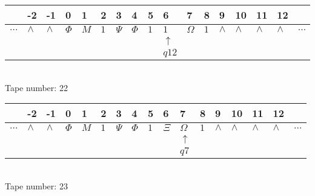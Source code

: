 \documentclass{article}
\begin{document}
\begin{table}[H]
\centering
\begin{tabular}{lllllllllllllllll}
 & -2 & -1 & 0 & 1 & 2 & 3 & 4 & 5 & 6 & 7 & 8 & 9 & 10 & 11 & 12 & \\
\hline
$...$ & \multicolumn{1}{|l|}{$\wedge$} & \multicolumn{1}{|l|}{$\wedge$} & \multicolumn{1}{|l|}{$\Phi$} & \multicolumn{1}{|l|}{$M$} & \multicolumn{1}{|l|}{$1$} & \multicolumn{1}{|l|}{$\Psi$} & \multicolumn{1}{|l|}{$\Phi$} & \multicolumn{1}{|l|}{$1$} & \multicolumn{1}{|l|}{$1$} & \multicolumn{1}{|l|}{$\Omega$} & \multicolumn{1}{|l|}{$1$} & \multicolumn{1}{|l|}{$\wedge$} & \multicolumn{1}{|l|}{$\wedge$} & \multicolumn{1}{|l|}{$\wedge$} & \multicolumn{1}{|l|}{$\wedge$} & $...$\\
\hline
&  &  &  &  &  &  &  &  & $\uparrow$ &  &  &  &  &  &  &  \\
&  &  &  &  &  &  &  &  & $ q12 $ &  &  &  &  &  &  &  \\
\end{tabular}
\\
Tape number: 22
\noindent\makebox[\linewidth]{\hdashrule{\textwidth}{1pt}{1pt}}\end{table}

\begin{table}[H]
\centering
\begin{tabular}{lllllllllllllllll}
 & -2 & -1 & 0 & 1 & 2 & 3 & 4 & 5 & 6 & 7 & 8 & 9 & 10 & 11 & 12 & \\
\hline
$...$ & \multicolumn{1}{|l|}{$\wedge$} & \multicolumn{1}{|l|}{$\wedge$} & \multicolumn{1}{|l|}{$\Phi$} & \multicolumn{1}{|l|}{$M$} & \multicolumn{1}{|l|}{$1$} & \multicolumn{1}{|l|}{$\Psi$} & \multicolumn{1}{|l|}{$\Phi$} & \multicolumn{1}{|l|}{$1$} & \multicolumn{1}{|l|}{$\Xi$} & \multicolumn{1}{|l|}{$\Omega$} & \multicolumn{1}{|l|}{$1$} & \multicolumn{1}{|l|}{$\wedge$} & \multicolumn{1}{|l|}{$\wedge$} & \multicolumn{1}{|l|}{$\wedge$} & \multicolumn{1}{|l|}{$\wedge$} & $...$\\
\hline
&  &  &  &  &  &  &  &  &  & $\uparrow$ &  &  &  &  &  &  \\
&  &  &  &  &  &  &  &  &  & $ q7 $ &  &  &  &  &  &  \\
\end{tabular}
\\
Tape number: 23
\noindent\makebox[\linewidth]{\hdashrule{\textwidth}{1pt}{1pt}}\end{table}
\clearpage
\end{document}
